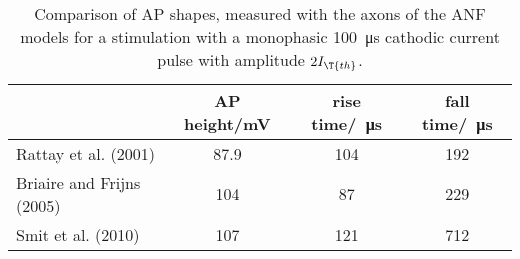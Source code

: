 \begin{table}[htb]
\centering
\caption{Comparison of AP shapes, measured with the axons of the ANF models for a stimulation with a monophasic \SI{100}{\micro\second} cathodic current pulse with amplitude $2I_{\T{th}}$.}
\begin{tabular}{l|ccc}
& AP height/mV & rise time/\SI{}{\micro\second} & fall time/\SI{}{\micro\second}\\\hline
Rattay et al. (2001) & 87.9 & 104 & 192\\
Briaire and Frijns (2005) & 104 & 87 & 229\\
Smit et al. (2010) & 107 & 121 & 712\\
\end{tabular}
\label{tbl:AP_shape_comparison}
\end{table}